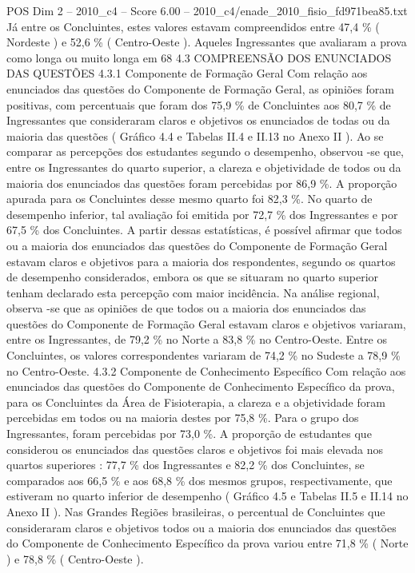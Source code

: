 \begin{textsample}{POS Dim 2 – 2010\_c4 – Score 6.00 – 2010\_c4/enade\_2010\_fisio\_fd971bea85.txt}
Já entre os Concluintes, estes valores estavam compreendidos entre 47,4 \% ( Nordeste ) e 52,6 \% ( Centro-Oeste ).
Aqueles Ingressantes que avaliaram a prova como longa ou muito longa em 68 4.3 COMPREENSÃO DOS ENUNCIADOS DAS QUESTÕES 4.3.1 Componente de Formação Geral Com relação aos enunciados das questões do Componente de Formação Geral, as opiniões foram positivas, com percentuais que foram dos 75,9 \% de Concluintes aos 80,7 \% de Ingressantes que consideraram claros e objetivos os enunciados de todas ou da maioria das questões ( Gráfico 4.4 e Tabelas II.4 e II.13 no Anexo II ).
Ao se comparar as percepções dos estudantes segundo o desempenho, observou -se que, entre os Ingressantes do quarto superior, a clareza e objetividade de todos ou da maioria dos enunciados das questões foram percebidas por 86,9 \%.
A proporção apurada para os Concluintes desse mesmo quarto foi 82,3 \%.
No quarto de desempenho inferior, tal avaliação foi emitida por 72,7 \% dos Ingressantes e por 67,5 \% dos Concluintes.
A partir dessas estatísticas, é possível afirmar que todos ou a maioria dos enunciados das questões do Componente de Formação Geral estavam claros e objetivos para a maioria dos respondentes, segundo os quartos de desempenho considerados, embora os que se situaram no quarto superior tenham declarado esta percepção com maior incidência.
Na análise regional, observa -se que as opiniões de que todos ou a maioria dos enunciados das questões do Componente de Formação Geral estavam claros e objetivos variaram, entre os Ingressantes, de 79,2 \% no Norte a 83,8 \% no Centro-Oeste.
Entre os Concluintes, os valores correspondentes variaram de 74,2 \% no Sudeste a 78,9 \% no Centro-Oeste. 4.3.2 Componente de Conhecimento Específico Com relação aos enunciados das questões do Componente de Conhecimento Específico da prova, para os Concluintes da Área de Fisioterapia, a clareza e a objetividade foram percebidas em todos ou na maioria destes por 75,8 \%.
Para o grupo dos Ingressantes, foram percebidas por 73,0 \%.
A proporção de estudantes que considerou os enunciados das questões claros e objetivos foi mais elevada nos quartos superiores : 77,7 \% dos Ingressantes e 82,2 \% dos Concluintes, se comparados aos 66,5 \% e aos 68,8 \% dos mesmos grupos, respectivamente, que estiveram no quarto inferior de desempenho ( Gráfico 4.5 e Tabelas II.5 e II.14 no Anexo II ).
Nas Grandes Regiões brasileiras, o percentual de Concluintes que consideraram claros e objetivos todos ou a maioria dos enunciados das questões do Componente de Conhecimento Específico da prova variou entre 71,8 \% ( Norte ) e 78,8 \% ( Centro-Oeste ).

\end{textsample}
